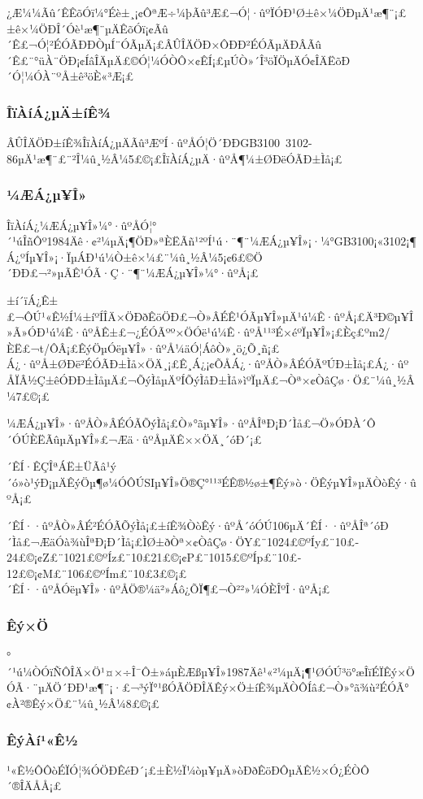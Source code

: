 ¿Æ¼¼Ãû´ÊÊõÓï¼°Éè±¸¡¢ÔªÆ÷¼þÃû³Æ£¬Ó¦·ûºÏÓÐ¹Ø±ê×¼ÖÐµÄ¹æ¶¨¡£±ê×¼ÖÐÎ´Óè¹æ¶¨µÄÊõÓï¡¢Ãû´Ê£¬Ó¦²ÉÓÃÐÐÒµÍ¨ÓÃµÄ¡£ÂÛÎÄÖÐ×ÔÐÐ²ÉÓÃµÄÐÂÃû´Ê£¨°üÀ¨ÖÐ¡¢ÍâÎÄµÄ£©Ó¦¼ÓÒÔ×¢ÊÍ¡£µÚÒ»´Î³öÏÖµÄÓ¢ÎÄËõÐ´Ó¦¼ÓÀ¨ºÅ±ê³öÈ«³Æ¡£

\subsubsection{ÎïÀíÁ¿µÄ±íÊ¾}

ÂÛÎÄÖÐ±íÊ¾ÎïÀíÁ¿µÄÃû³ÆºÍ·ûºÅÓ¦Ö´ÐÐGB3100~3102-86µÄ¹æ¶¨£¨²Î¼û¸½Â¼5£©¡£ÎïÀíÁ¿µÄ·ûºÅ¶¼±ØÐëÓÃÐ±Ìå¡£

\subsubsection{¼ÆÁ¿µ¥Î»}

ÎïÀíÁ¿¼ÆÁ¿µ¥Î»¼°·ûºÅÓ¦°´¹úÎñÔº1984Äê·¢²¼µÄ¡¶ÖÐ»ªÈËÃñ¹²ºÍ¹ú·¨¶¨¼ÆÁ¿µ¥Î»¡·¼°GB3100¡«3102¡¶Á¿ºÍµ¥Î»¡·ÏµÁÐ¹ú¼Ò±ê×¼£¨¼û¸½Â¼5¡¢6£©Ö´ÐÐ£¬²»µÃÊ¹ÓÃ·Ç·¨¶¨¼ÆÁ¿µ¥Î»¼°·ûºÅ¡£

±í´ïÁ¿Ê±£¬ÔÚ¹«Ê½Í¼±íºÍÎÄ×ÖÐðÊöÖÐ£¬Ò»ÂÉÊ¹ÓÃµ¥Î»µÄ¹ú¼Ê·ûºÅ¡£Ä³Ð©µ¥Î»Ã»ÓÐ¹ú¼Ê·ûºÅÊ±£¬¿ÉÓÃºº×ÖÓë¹ú¼Ê·ûºÅ¹¹³É×éºÏµ¥Î»¡£Èç£ºm2/ÈË£¬t/ÔÂ¡£ÊýÖµÓëµ¥Î»·ûºÅ¼äÓ¦ÁôÒ»¸ö¿Õ¸ñ¡£
Á¿·ûºÅ±ØÐë²ÉÓÃÐ±Ìå×ÖÄ¸¡£Ê¸Á¿¡¢ÕÅÁ¿·ûºÅÒ»ÂÉÓÃºÚÐ±Ìå¡£Á¿·ûºÅÏÂ½Ç±êÓÐÐ±ÌåµÄ£¬ÕýÌåµÄºÍÕýÌåÐ±Ìå»ìºÏµÄ£¬Òª×¢ÒâÇø·Ö£¨¼û¸½Â¼7£©¡£

¼ÆÁ¿µ¥Î»·ûºÅÒ»ÂÉÓÃÕýÌå¡£Ò»°ãµ¥Î»·ûºÅÎªÐ¡Ð´Ìå£¬Ö»ÓÐÀ´Ô´ÓÚÈËÃûµÄµ¥Î»£¬Æä·ûºÅµÄÊ××ÖÄ¸´óÐ´¡£

´ÊÍ·ÊÇÎªÁË±ÜÃâ¹ý´ó»ò¹ýÐ¡µÄÊýÖµ¶ø¼ÓÔÚSIµ¥Î»Ö®Ç°¹¹³ÉÊ®½ø±¶Êý»ò·ÖÊýµ¥Î»µÄÒòÊý·ûºÅ¡£

´ÊÍ··ûºÅÒ»ÂÉ²ÉÓÃÕýÌå¡£±íÊ¾ÒòÊý·ûºÅ´óÓÚ106µÄ´ÊÍ··ûºÅÎª´óÐ´Ìå£¬ÆäÓà¾ùÎªÐ¡Ð´Ìå¡£ÌØ±ðÒª×¢ÒâÇø·ÖY£¨1024£©ºÍy£¨10£­24£©¡¢Z£¨1021£©ºÍz£¨10£­21£©¡¢P£¨1015£©ºÍp£¨10£­12£©¡¢M£¨106£©ºÍm£¨10£­3£©¡£´ÊÍ··ûºÅÓëµ¥Î»·ûºÅÖ®¼ä²»Áô¿ÕÏ¶£¬Ò²²»¼ÓÈÎºÎ·ûºÅ¡£

\subsubsection{Êý×Ö}

°´¹ú¼ÒÓïÑÔÎÄ×Ö¹¤×÷Î¯Ô±»áµÈÆßµ¥Î»1987Äê¹«²¼µÄ¡¶¹ØÓÚ³ö°æÎïÉÏÊý×ÖÓÃ·¨µÄÖ´ÐÐ¹æ¶¨¡·£¬³ýÏ°¹ßÓÃÖÐÎÄÊý×Ö±íÊ¾µÄÒÔÍâ£¬Ò»°ã¾ù²ÉÓÃ°¢À­²®Êý×Ö£¨¼û¸½Â¼8£©¡£

\subsubsection{ÊýÀí¹«Ê½}

¹«Ê½Ô­ÔòÉÏÓ¦¾ÓÖÐÊéÐ´¡£±È½Ï¼òµ¥µÄ»òÐðÊöÐÔµÄÊ½×Ó¿ÉÒÔ´®ÎÄÅÅ¡£

